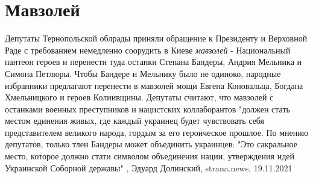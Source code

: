  
 
 
 
 
\chapter{Мавзолей}

Депутаты Тернопольской облрады приняли обращение к Президенту и Верховной Раде
с требованием немедленно соорудить в Киеве \emph{мавзолей} - Национальный пантеон
героев и перенести туда останки Степана Бандеры, Андрия Мельника и Симона
Петлюры.  Чтобы Бандере и Мельнику было не одиноко, народные избранники
предлагают перенести в мавзолей мощи Евгена Коновальца, Богдана Хмельницкого и
героев Колиивщины.  Депутаты считают, что мавзолей с останками военных
преступников и нацистских коллаборантов "должен стать местом единения живых,
где каждый украинец будет чувствовать себя представителем великого народа,
гордым за его героическое прошлое.  По мнению депутатов, только тлен Бандеры
может объединить украинцев: "Это сакральное место, которое должно стати
символом объединения нации, утверждения идей Украинской Соборной державы"
, 
Эдуард Долинский, strana.news, 19.11.2021
